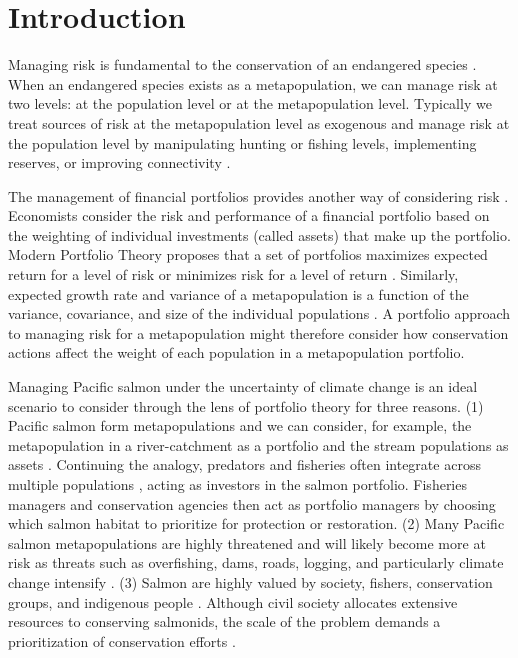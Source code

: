 \section{Introduction}

Managing risk is fundamental to the conservation of an endangered species \citep{burgman2005, iucn2009}. When an endangered species exists as a metapopulation, we can manage risk at two levels: at the population level or at the metapopulation level. Typically we treat sources of risk at the metapopulation level as exogenous and manage risk at the population level by manipulating hunting or fishing levels, implementing reserves, or improving connectivity \citep[e.g.][]{akcakaya2007}.

The management of financial portfolios provides another way of considering risk \citep{figge2004, koellner2006, ando2012}. Economists consider the risk and performance of a financial portfolio based on the weighting of individual investments (called assets) that make up the portfolio. Modern Portfolio Theory proposes that a set of portfolios maximizes expected return for a level of risk or minimizes risk for a level of return \citep{markowitz1952, markowitz1959}. Similarly, expected growth rate and variance of a metapopulation is a function of the variance, covariance, and size of the individual populations \citep{moore2010}. A portfolio approach to managing risk for a metapopulation might therefore consider how conservation actions affect the weight of each population in a metapopulation portfolio.

Managing Pacific salmon under the uncertainty of climate change is an ideal scenario to consider through the lens of portfolio theory for three reasons. (1) Pacific salmon form metapopulations \citep{rieman2000, schtickzelle2007} and we can consider, for example, the metapopulation in a river-catchment as a portfolio and the stream populations as assets \citep{schindler2010, moore2010}. Continuing the analogy, predators and fisheries often integrate across multiple populations \citep{hilborn2003, schindler2008}, acting as investors in the salmon portfolio. Fisheries managers and conservation agencies then act as portfolio managers by choosing which salmon habitat to prioritize for protection or restoration. (2) Many Pacific salmon metapopulations are highly threatened \citep{mcclure2003, gustafson2007, peterman2012} and will likely become more at risk as threats such as overfishing, dams, roads, logging, and particularly climate change intensify \citep[e.g.][]{lackey2003}. (3) Salmon are highly valued by society, fishers, conservation groups, and indigenous people \citep{nrc1996}. Although civil society allocates extensive resources to conserving salmonids, the scale of the problem demands a prioritization of conservation efforts \citep{allendorf1997}.

